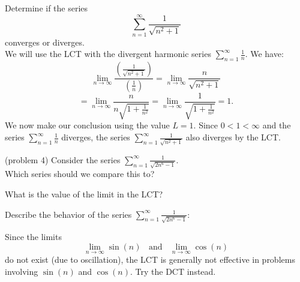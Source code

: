 \documentclass[handout]{ximera}
\begin{document}
\begin{example}[example 4]
Determine if the series 
\[
\sum_{n=1}^\infty \frac{1}{\sqrt{n^2 + 1}}
\]
converges or diverges.\\
We will use the LCT with the divergent harmonic series $\displaystyle{\sum_{n=1}^\infty \frac{1}{n}}$. We have:
\[
\lim_{n \to \infty} \frac{\left(\frac{1}{\sqrt{n^2 + 1}}\right)}{\left(\frac{1}{n}\right)} = \lim_{n \to \infty} \frac{n}{\sqrt{n^2 + 1}}
\]
\[
= \lim_{n \to \infty} \frac{n}{n\sqrt{1 + \frac{1}{n^2}}} = \lim_{n \to \infty} \frac{1}{\sqrt{1 + \frac{1}{n^2}}} = 1.
\]
We now make our conclusion using the value $L = 1$. Since $0 < 1 < \infty$ and the series $\displaystyle{\sum_{n=1}^\infty \frac{1}{n}}$
diverges, the series $\displaystyle{\sum_{n=1}^\infty \frac{1}{\sqrt{n^2 + 1}}}$ also diverges by the LCT.
\end{example}




\begin{problem}(problem 4)
Consider the series $\displaystyle{\sum_{n=1}^\infty \frac{1}{\sqrt{2n^6 - 1}}}$.\\
Which series should we compare this to?

\begin{multipleChoice}
\end{multipleChoice}

What is the value of the limit in the LCT?
\begin{multipleChoice}
\end{multipleChoice}

Describe the behavior of the series $\sum_{n=1}^\infty \frac{1}{\sqrt{2n^6 - 1}}:$
\begin{multipleChoice}
\end{multipleChoice}

\end{problem}


\begin{remark}
Since the limits
\[
\lim_{n \to \infty} \sin(n) \;\; \text{ and } \;\; \lim_{n \to \infty} \cos(n)
\]
do not exist (due to oscillation), the LCT is generally not effective in problems involving $\sin(n)$ and $\cos(n)$. Try the DCT instead.
\end{remark}
\end{document}
